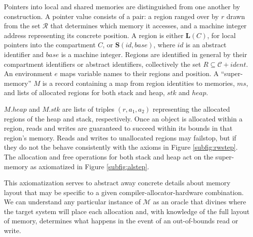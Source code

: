 \documentclass{article}
\begin{document}
Pointers into local and shared memories are distinguished from one another by construction.
A pointer value consists of a pair: a region ranged over by \(r\) drawn from the set
\(\mathcal{R}\) that determines which memory it accesses, and a machine integer address representing
its concrete position. A region is either \(\mathbf{L}(C)\), for local pointers into
the compartment \(C\), or \(\mathbf{S}(id,\mathit{base})\), where \(id\) is an
abstract identifier and \(\mathit{base}\) is a machine integer. Regions are identified
in general by their compartment identifiers or abstract identifiers, collectively
the set \(R \subseteq \mathcal{C} + \mathit{ident}\). An environment \(e\) maps variable names to
their regions and position. A ``super-memory'' \(M\)
is a record containing a map from region identities to memories, \(ms\),
and lists of allocated regions for both stack and heap, \(stk\) and \(heap\).

\(M.heap\) and \(M.stk\) are lists of triples \((r, a_1, a_2)\) representing
the allocated regions of the heap and stack, respectively.
Once an object is allocated within a region, reads and writes are guaranteed to succeed
within its bounds in that region's memory. Reads and writes to unallocated regions may
failstop, but if they do not the behave consistently with the axioms in Figure \ref{subfig:rwstep}.
The allocation and free operations for both stack and heap act on the super-memory
as axiomatized in Figure \ref{subfig:alstep}.

This axiomatization serves to abstract away concrete details about memory layout
that may be specific to a given compiler-allocator-hardware combination. We can
understand any particular instance of \(\mathcal{M}\) as an oracle that divines where
the target system will place each allocation and, with knowledge of the full layout of
memory, determines what happens in the event of an out-of-bounds read or write.
\end{document}
